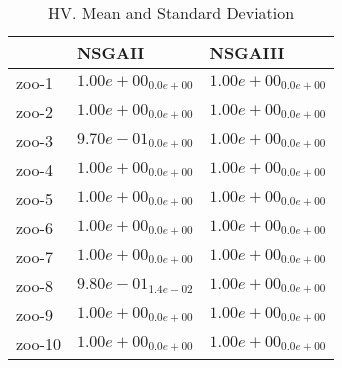 \documentclass{article}
\begin{document}
\begin{table}
\caption{HV. Mean and Standard Deviation}
\label{table: HV}
\centering
\begin{scriptsize}
\begin{tabular}{lll}
\hline & NSGAII &  NSGAIII\\
\hline 
zoo-1 & \cellcolor{gray95}$  1.00e+00_{ 0.0e+00}$ & \cellcolor{gray25}$  1.00e+00_{ 0.0e+00}$ \\
zoo-2 & \cellcolor{gray95}$  1.00e+00_{ 0.0e+00}$ & \cellcolor{gray25}$  1.00e+00_{ 0.0e+00}$ \\
zoo-3 & \cellcolor{gray25}$  9.70e-01_{ 0.0e+00}$ & \cellcolor{gray95}$  1.00e+00_{ 0.0e+00}$ \\
zoo-4 & \cellcolor{gray95}$  1.00e+00_{ 0.0e+00}$ & \cellcolor{gray25}$  1.00e+00_{ 0.0e+00}$ \\
zoo-5 & \cellcolor{gray95}$  1.00e+00_{ 0.0e+00}$ & \cellcolor{gray25}$  1.00e+00_{ 0.0e+00}$ \\
zoo-6 & \cellcolor{gray95}$  1.00e+00_{ 0.0e+00}$ & \cellcolor{gray25}$  1.00e+00_{ 0.0e+00}$ \\
zoo-7 & \cellcolor{gray95}$  1.00e+00_{ 0.0e+00}$ & \cellcolor{gray25}$  1.00e+00_{ 0.0e+00}$ \\
zoo-8 & \cellcolor{gray25}$  9.80e-01_{ 1.4e-02}$ & \cellcolor{gray95}$  1.00e+00_{ 0.0e+00}$ \\
zoo-9 & \cellcolor{gray95}$  1.00e+00_{ 0.0e+00}$ & \cellcolor{gray25}$  1.00e+00_{ 0.0e+00}$ \\
zoo-10 & \cellcolor{gray95}$  1.00e+00_{ 0.0e+00}$ & \cellcolor{gray25}$  1.00e+00_{ 0.0e+00}$ \\
\hline
\end{tabular}
\end{scriptsize}
\end{table}
\end{document}
